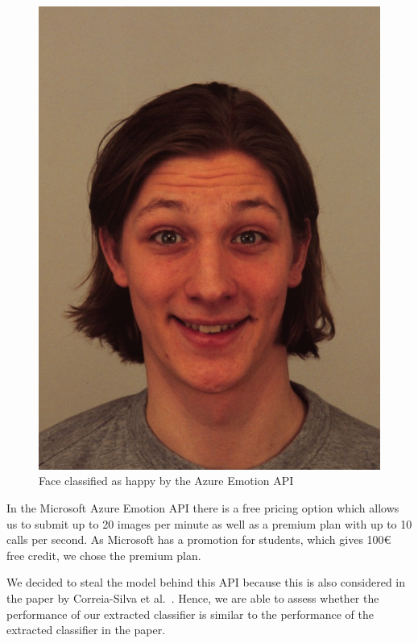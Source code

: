\documentclass[a4paper,11pt]{article}
\begin{document}
            \begin{figure}[h!]
                    \centering      \includegraphics[scale=0.2]{exercise_3/paper/images/AM18HAS.JPG}
                    \caption{Face classified as happy by the Azure Emotion API}
                    \label{fig:happy_face}
            \end{figure}
        
        In the Microsoft Azure Emotion API there is a free pricing option which allows us to submit up to 20 images per minute as well as a premium plan with up to 10 calls per second. As Microsoft has a promotion for students, which gives 100€ free credit, we chose the premium plan. %
        
        We decided to steal the model behind this API because this is also considered in the paper by Correia-Silva et al.~\cite{copycat}. Hence, we are able to assess whether the performance of our extracted classifier is similar to the performance of the extracted classifier in the paper.
        
\end{document}
